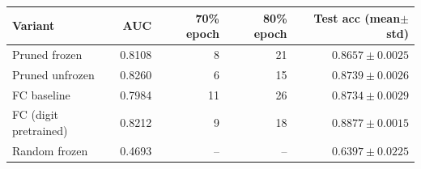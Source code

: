 \begin{tabular}{lrrrr}
\toprule
Variant & AUC & 70\% epoch & 80\% epoch & Test acc (mean$\pm$std) \\
\midrule
Pruned frozen & 0.8108 & 8 & 21 & $0.8657\pm0.0025$ \\
Pruned unfrozen & 0.8260 & 6 & 15 & $0.8739\pm0.0026$ \\
FC baseline & 0.7984 & 11 & 26 & $0.8734\pm0.0029$ \\
FC (digit pretrained) & 0.8212 & 9 & 18 & $0.8877\pm0.0015$ \\
Random frozen & 0.4693 &  --  &  --  & $0.6397\pm0.0225$ \\
\bottomrule
\end{tabular}
